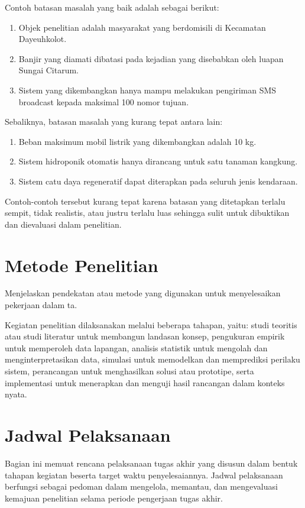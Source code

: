 Contoh batasan masalah yang baik adalah sebagai berikut:

\begin{enumerate}[topsep=0pt,itemsep=0pt,parsep=0pt,leftmargin=*]
\item Objek penelitian adalah masyarakat yang berdomisili di Kecamatan Dayeuhkolot.
\item Banjir yang diamati dibatasi pada kejadian yang disebabkan oleh luapan Sungai Citarum.
\item Sistem yang dikembangkan hanya mampu melakukan pengiriman SMS broadcast kepada maksimal 100 nomor tujuan.
\end{enumerate}

Sebaliknya, batasan masalah yang kurang tepat antara lain:

\begin{enumerate}[topsep=0pt,itemsep=0pt,parsep=0pt,leftmargin=*]
\item Beban maksimum mobil listrik yang dikembangkan adalah 10 kg.
\item Sistem hidroponik otomatis hanya dirancang untuk satu tanaman kangkung.
\item Sistem catu daya regeneratif dapat diterapkan pada seluruh jenis kendaraan.
\end{enumerate}

Contoh-contoh tersebut kurang tepat karena batasan yang ditetapkan terlalu sempit, tidak realistis, atau justru terlalu luas sehingga sulit untuk dibuktikan dan dievaluasi dalam penelitian.


\section{Metode Penelitian}
Menjelaskan pendekatan atau metode yang digunakan untuk menyelesaikan pekerjaan dalam \gls{ta}. 

Kegiatan penelitian dilaksanakan melalui beberapa tahapan, yaitu: studi teoritis atau studi literatur untuk membangun landasan konsep, pengukuran empirik untuk memperoleh data lapangan, analisis statistik untuk mengolah dan menginterpretasikan data, simulasi untuk memodelkan dan memprediksi perilaku sistem, perancangan untuk menghasilkan solusi atau prototipe, serta implementasi untuk menerapkan dan menguji hasil rancangan dalam konteks nyata.

\section{Jadwal Pelaksanaan}
Bagian ini memuat rencana pelaksanaan tugas akhir yang disusun dalam bentuk tahapan kegiatan beserta target waktu penyelesaiannya. Jadwal pelaksanaan berfungsi sebagai pedoman dalam mengelola, memantau, dan mengevaluasi kemajuan penelitian selama periode pengerjaan tugas akhir.

